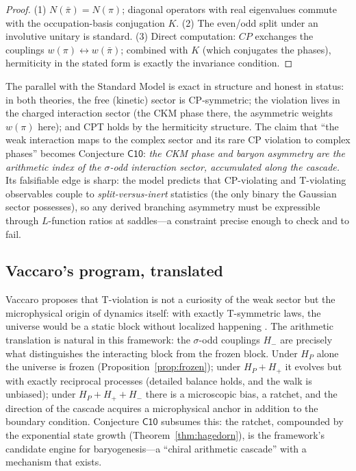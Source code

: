 \documentclass[11pt,a4paper]{article}
\theoremstyle{plain}
\theoremstyle{definition}
\theoremstyle{remark}
\begin{document}
\begin{proof}
(1) $N(\bar\pi)=N(\pi)$; diagonal operators with real eigenvalues commute with the
occupation-basis conjugation $K$. (2) The even/odd split under an involutive unitary is
standard. (3) Direct computation: $CP$ exchanges the couplings $w(\pi)\leftrightarrow
w(\bar\pi)$; combined with $K$ (which conjugates the phases), hermiticity in the stated
form is exactly the invariance condition.
\end{proof}

The parallel with the Standard Model is exact in structure and honest in status: in both
theories, the free (kinetic) sector is CP-symmetric; the violation lives in the charged
interaction sector (the CKM phase there, the asymmetric weights $w(\pi)$ here); and CPT
holds by the hermiticity structure. The claim that ``the weak interaction maps to
the complex sector and its rare CP violation to complex phases'' becomes Conjecture
$\mathsf{C10}$: \emph{the CKM phase and baryon asymmetry are the arithmetic index of the
$\sigma$-odd interaction sector, accumulated along the cascade.} Its falsifiable edge is
sharp: the model predicts that CP-violating and T-violating observables couple to
\emph{split-versus-inert} statistics (the only binary the Gaussian sector possesses), so
any derived branching asymmetry must be expressible through $L$-function ratios at
saddles---a constraint precise enough to check and to fail.

\subsection{Vaccaro's program, translated}

Vaccaro proposes that T-violation is not a curiosity of the weak sector but the
microphysical origin of dynamics itself: with exactly T-symmetric laws, the universe would
be a static block without localized happening \cite{vaccaro2016}. The arithmetic translation
is natural in this framework: the $\sigma$-odd couplings
$H_{-}$ are precisely what distinguishes the interacting block from the frozen block. Under
$H_{P}$ alone the universe is frozen (Proposition~\ref{prop:frozen}); under
$H_{P}+H_{+}$ it evolves but with exactly reciprocal processes (detailed balance holds, and
the walk is unbiased); under $H_{P}+H_{+}+H_{-}$ there is a microscopic bias, a ratchet,
and the direction of the cascade acquires a microphysical anchor in addition to the
boundary condition. Conjecture $\mathsf{C10}$ subsumes this: the ratchet, compounded by the
exponential state growth (Theorem~\ref{thm:hagedorn}), is the framework's candidate engine
for baryogenesis---a ``chiral arithmetic cascade'' with a mechanism that
exists.
\end{document}
